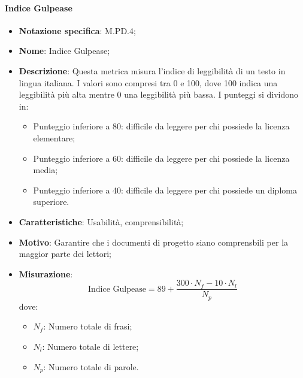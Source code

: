 \paragraph*{Indice Gulpease}
\begin{itemize}
    \item \textbf{Notazione specifica}: M.PD.4;
    \item \textbf{Nome}: Indice Gulpease;
    \item \textbf{Descrizione}: Questa metrica misura l'indice di leggibilità di un testo in lingua italiana. I valori sono compresi tra 0 e 100, dove 100 indica una leggibilità più alta mentre 0 una leggibilità più bassa. I punteggi si dividono in:
    \begin{itemize}
        \item Punteggio inferiore a 80: difficile da leggere per chi possiede la licenza elementare;
        \item Punteggio inferiore a 60: difficile da leggere per chi possiede la licenza media;
        \item Punteggio inferiore a 40: difficile da leggere per chi possiede un diploma superiore.
    \end{itemize}
    \item \textbf{Caratteristiche}: Usabilità, comprensibilità;
    \item \textbf{Motivo}: Garantire che i documenti di progetto siano comprensbili per la maggior parte dei lettori;
    \item \textbf{Misurazione}:
    \[
        \text{Indice Gulpease} = 89 + \frac{{300 \cdot {{N_f}} - 10 \cdot {{N_l}}}}{{{{N_p}}}}
    \]
    dove:
    \begin{itemize}
        \item $N_{f}$: Numero totale di frasi;
        \item $N_{l}$: Numero totale di lettere;
        \item $N_{p}$: Numero totale di parole.
    \end{itemize}
\end{itemize}

